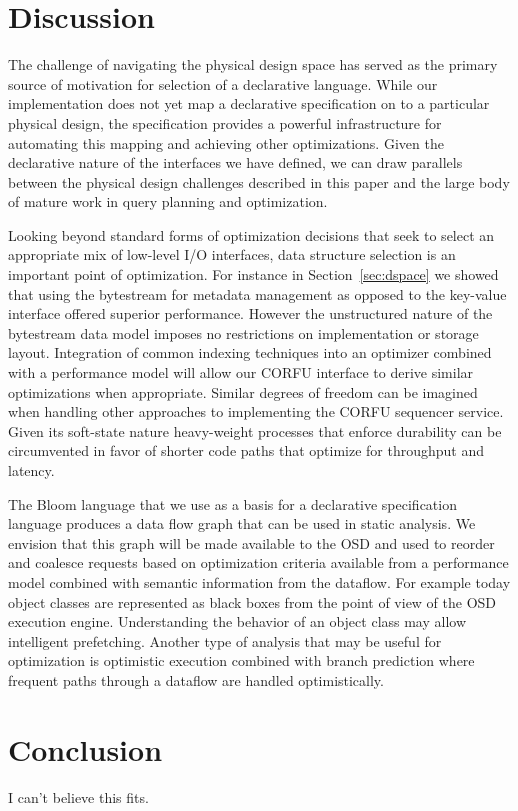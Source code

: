 \section{Discussion}
\label{sec:opts}

The challenge of navigating the physical design space has served as the
primary source of motivation for selection of a declarative language.  While
our implementation does not yet map a declarative specification on to a
particular physical design, the specification provides a powerful
infrastructure for automating this mapping and achieving other optimizations.
Given the declarative nature of the interfaces we have defined, we can draw
parallels between the physical design challenges described in this paper and
the large body of mature work in query planning and optimization.

Looking beyond standard forms of optimization decisions that seek to select
an appropriate mix of low-level I/O interfaces, data structure selection is an
important point of optimization. For instance in Section~\ref{sec:dspace} we
showed that using the bytestream for metadata management as opposed to the
key-value interface offered superior performance. However the unstructured
nature of the bytestream data model imposes no restrictions on implementation
or storage layout. Integration of common indexing techniques into an optimizer
combined with a performance model will allow our CORFU interface to derive
similar optimizations when appropriate. Similar degrees of freedom can be
imagined when handling other approaches to implementing the CORFU sequencer
service. Given its soft-state nature heavy-weight processes that enforce
durability can be circumvented in favor of shorter code paths that optimize
for throughput and latency.

The Bloom language that we use as a basis for a declarative specification
language produces a data flow graph that can be used in static analysis. We
envision that this graph will be made available to the OSD and used to reorder
and coalesce requests based on optimization criteria available from a
performance model combined with semantic information from the dataflow. For
example today object classes are represented as black boxes from the point of
view of the OSD execution engine.  Understanding the behavior of an object
class may allow intelligent prefetching. Another type of analysis that may be
useful for optimization is optimistic execution combined with branch
prediction where frequent paths through a dataflow are handled optimistically.

\section{Conclusion}

I can't believe this fits.
